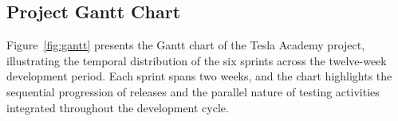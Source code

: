 
\subsection{Project Gantt Chart}

Figure~\ref{fig:gantt} presents the Gantt chart of the Tesla Academy project,
illustrating the temporal distribution of the six sprints across the twelve-week
development period. Each sprint spans two weeks, and the chart highlights the
sequential progression of releases and the parallel nature of testing activities
integrated throughout the development cycle.

